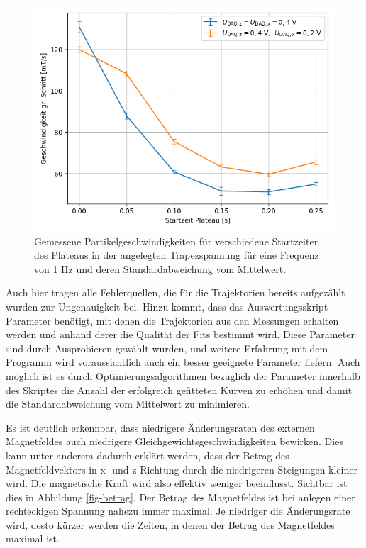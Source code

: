 \documentclass[page,pdftex,12pt,a4paper,twoside,openright]{scrbook}
\begin{document}
\begin{figure}[!h]
\centering
\includegraphics[width=.75\textwidth]{./img/v.png}
\caption{\label{fig-img_v}
Gemessene Partikelgeschwindigkeiten für verschiedene Startzeiten des Plateaus in der angelegten Trapezspannung für eine Frequenz von 1 Hz und deren Standardabweichung vom Mittelwert.}
\end{figure}

Auch hier tragen alle Fehlerquellen, die für die Trajektorien bereits aufgezählt wurden zur Ungenauigkeit bei. Hinzu kommt, dass das Auswertungsskript Parameter benötigt, mit denen die Trajektorien aus den Messungen erhalten werden und anhand derer die Qualität der Fits bestimmt wird. Diese Parameter sind durch Ausprobieren gewählt wurden, und weitere Erfahrung mit dem Programm wird voraussichtlich auch ein besser geeignete Parameter liefern. Auch möglich ist es durch Optimierungsalgorithmen bezüglich der Parameter innerhalb des Skriptes die Anzahl der erfolgreich gefitteten Kurven zu erhöhen und damit die Standardabweichung vom Mittelwert zu minimieren.

Es ist deutlich erkennbar, dass niedrigere Änderungsraten des externen Magnetfeldes auch niedrigere Gleichgewichtsgeschwindigkeiten bewirken. Dies kann unter anderem dadurch erklärt werden, dass der Betrag des Magnetfeldvektors in x- und z-Richtung durch die niedrigeren Steigungen kleiner wird. Die magnetische Kraft wird also effektiv weniger beeinflusst. Sichtbar ist dies in Abbildung \ref{fig-betrag}. Der Betrag des Magnetfeldes ist bei anlegen einer rechteckigen Spannung nahezu immer maximal. Je niedriger die Änderungsrate wird, desto kürzer werden die Zeiten, in denen der Betrag des Magnetfeldes maximal ist.
\end{document}
